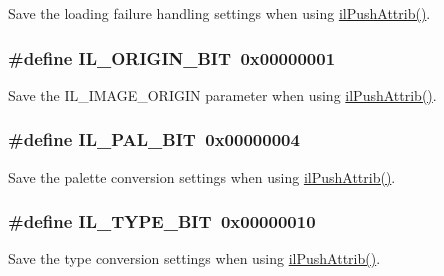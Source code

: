 Save the loading failure handling settings when using \hyperlink{group__state_ga72e0879c71f59f06c35d2e2a10191fa8}{il\+Push\+Attrib()}. 

\hypertarget{group__il__bits_ga78b20daea302bfc1d332ac4d2e6cecfb}{
\subsubsection[{I\+L\+\_\+\+O\+R\+I\+G\+I\+N\+\_\+\+B\+I\+T}]{\setlength{\rightskip}{0pt plus 5cm}\#define I\+L\+\_\+\+O\+R\+I\+G\+I\+N\+\_\+\+B\+I\+T~0x00000001}}\label{group__il__bits_ga78b20daea302bfc1d332ac4d2e6cecfb}


Save the I\+L\+\_\+\+I\+M\+A\+G\+E\+\_\+\+O\+R\+I\+G\+I\+N parameter when using \hyperlink{group__state_ga72e0879c71f59f06c35d2e2a10191fa8}{il\+Push\+Attrib()}. 

\hypertarget{group__il__bits_ga9078970cdf80a18b576e0b89a4a8dd22}{
\subsubsection[{I\+L\+\_\+\+P\+A\+L\+\_\+\+B\+I\+T}]{\setlength{\rightskip}{0pt plus 5cm}\#define I\+L\+\_\+\+P\+A\+L\+\_\+\+B\+I\+T~0x00000004}}\label{group__il__bits_ga9078970cdf80a18b576e0b89a4a8dd22}


Save the palette conversion settings when using \hyperlink{group__state_ga72e0879c71f59f06c35d2e2a10191fa8}{il\+Push\+Attrib()}. 

\hypertarget{group__il__bits_ga52465a50172c85a0c5f86008bd135850}{
\subsubsection[{I\+L\+\_\+\+T\+Y\+P\+E\+\_\+\+B\+I\+T}]{\setlength{\rightskip}{0pt plus 5cm}\#define I\+L\+\_\+\+T\+Y\+P\+E\+\_\+\+B\+I\+T~0x00000010}}\label{group__il__bits_ga52465a50172c85a0c5f86008bd135850}


Save the type conversion settings when using \hyperlink{group__state_ga72e0879c71f59f06c35d2e2a10191fa8}{il\+Push\+Attrib()}. 

